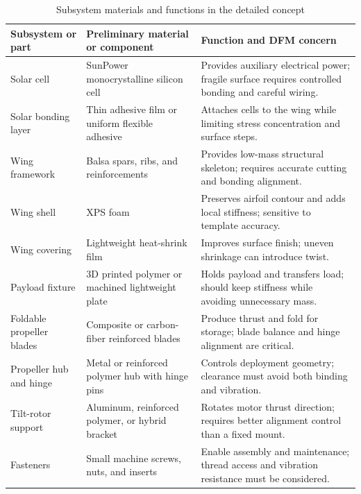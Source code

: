 \begin{table}[htbp]
    \centering
    \caption{Subsystem materials and functions in the detailed concept}
    \label{tab:subsystem-materials}
    \begin{tabular}{p{} p{} p{}}
        \toprule
        Subsystem or part & Preliminary material or component & Function and DFM concern \\
        \midrule
        Solar cell &
        SunPower monocrystalline silicon cell &
        Provides auxiliary electrical power; fragile surface requires controlled bonding and careful wiring. \\
        Solar bonding layer &
        Thin adhesive film or uniform flexible adhesive &
        Attaches cells to the wing while limiting stress concentration and surface steps. \\
        Wing framework &
        Balsa spars, ribs, and reinforcements &
        Provides low-mass structural skeleton; requires accurate cutting and bonding alignment. \\
        Wing shell &
        XPS foam &
        Preserves airfoil contour and adds local stiffness; sensitive to template accuracy. \\
        Wing covering &
        Lightweight heat-shrink film &
        Improves surface finish; uneven shrinkage can introduce twist. \\
        Payload fixture &
        3D printed polymer or machined lightweight plate &
        Holds payload and transfers load; should keep stiffness while avoiding unnecessary mass. \\
        Foldable propeller blades &
        Composite or carbon-fiber reinforced blades &
        Produce thrust and fold for storage; blade balance and hinge alignment are critical. \\
        Propeller hub and hinge &
        Metal or reinforced polymer hub with hinge pins &
        Controls deployment geometry; clearance must avoid both binding and vibration. \\
        Tilt-rotor support &
        Aluminum, reinforced polymer, or hybrid bracket &
        Rotates motor thrust direction; requires better alignment control than a fixed mount. \\
        Fasteners &
        Small machine screws, nuts, and inserts &
        Enable assembly and maintenance; thread access and vibration resistance must be considered. \\
        \bottomrule
    \end{tabular}
\end{table}

